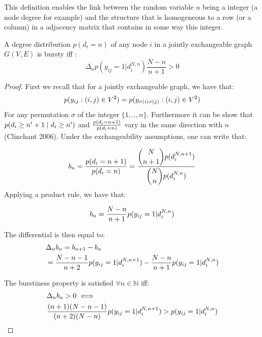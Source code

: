 This definition enables the link between the random variable $n$ being a integer (a node degree for example) and the structure that is homogeneous to a row (or a column) in a adjacency matrix that contains in some way this integer.

\begin{theorem} \label{th:burst_exch}
	 A degree distribution $p(d_i=n)$ of any node $i$ in a jointly exchangeable graph $G(V,E)$ is bursty iff :
	\begin{equation}
	 \Delta_n  p(y_{ij}=1 | d_i^{N,n}) \frac{N-n}{n+1} > 0
	\end{equation}

\end{theorem}

\begin{proof} 	\label{proof:glob}
	First we recall that for a jointly exchangeable graph, we have that:
	\begin{equation*}
	p(y_{ij}: (i,j) \in V^2) = p(y_{\sigma(i)\sigma(j)}: (i,j) \in V^2)
	\end{equation*}
	For any permutation $\sigma$ of the integer $\{1,..,n\}$. Furthermore it can be show that $ p(d_i \geq n'+1 \mid d_i \geq n')$ and $\frac{p(d_i=n+1)}{p(d_i=n)}$ vary in the same direction with $n$ (Clinchant 2006). Under the exchangeability assumptions, one can write that:
	
	\begin{align*}
	 b_n=\frac{p(d_i=n+1)}{p(d_i=n)} = \frac{\dbinom{N}{n+1} p(d_i^{N,n+1})}{\dbinom{N}{n} p(d_i^{N,n})}
	\end{align*}
 Applying a product rule, we have that:
	
	\begin{equation*}
	b_n = \frac{N-n}{n+1} p(y_{ij}=1 | d_i^{N,n})
	\end{equation*}
	
	The differential is then equal to:
	\begin{align*}
	&\Delta_n b_n= b_{n+1} - b_n  \\
	&= \frac{N-n-1}{n+2} p(y_{ij}=1 | d_i^{N,n+1}) - \frac{N-n}{n+1} p(y_{ij}=1 | d_i^{N,n})
	\end{align*}
	
	The burstiness property is satisfied  $\forall n \in \mathbb{N}$ iff:
	\begin{align*}
	&\Delta_nb_n > 0 \iff \\
	& \frac{(n+1)(N-n-1)}{(n+2)(N-n)}p(y_{ij}=1 | d_i^{N,n+1})  > p(y_{ij}=1 | d_i^{N,n})
	\end{align*}
	\label{b-theorem}
\end{proof}
	
